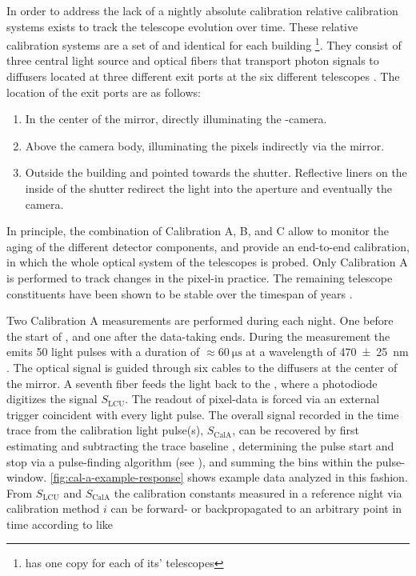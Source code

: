 In order to address the lack of a nightly absolute calibration relative 
calibration systems exists to track the telescope evolution over time. These 
relative calibration systems are a set of \LCUs and identical for each building
\footnote{\HEAT has one copy for each of its' telescopes}.
They consist of three central \LED light source and optical fibers that 
transport photon signals to diffusers located at three different exit ports at 
the six different telescopes \cite{robertsCalibrationPierreAuger2003}. The 
location of the exit ports are as follows:

\begin{enumerate}[label=(\Alph*)]
	\item In the center of the mirror, directly illuminating the 
	\FD-camera.
	\item Above the camera body, illuminating the pixels indirectly via the
	mirror.
	\item Outside the \FD building and pointed towards the shutter.
	Reflective liners on the inside of the shutter redirect the light into 
	the aperture and eventually the camera.
\end{enumerate}

In principle, the combination of Calibration A, B, and C allow to monitor the 
aging of the different detector components, and provide an end-to-end 
calibration, in which the whole optical system of the telescopes is probed. 
Only Calibration A is performed to track changes in the pixel-\PMTs in 
practice. The  remaining telescope constituents have been shown to be stable 
over the timespan of years \cite{brackAugerFluorescenceDetector2013, 
dorofeevFDAbsoluteCalibration2013}.

Two Calibration A measurements are performed during each night. One before the 
start of \DAQ, and one after the data-taking ends. During the measurement the 
\LED emits 50 light pulses with a duration of $\approx\SI{60}{\micro\second}$ 
at a wavelength of \SI{470\pm25}{\nano\meter} 
\cite{menshikovLEDCalibrationUnit}. The optical signal is guided through six 
cables to the diffusers at the center of the mirror. A seventh fiber feeds the 
light back to the \LCU, where a photodiode digitizes the signal 
$S_\mathrm{LCU}$. The readout of pixel-data is forced via an external trigger 
coincident with every light pulse. The overall signal recorded in the \FD time 
trace from the calibration light pulse(s), $S_\mathrm{CalA}$, can be recovered 
by first estimating and subtracting the trace baseline 
\cite{schaferReconstructionBaselineUndershoot2022}, determining the pulse start
and stop via a pulse-finding algorithm (see ), and 
summing the \ADC bins within the pulse-window. 
\cref{fig:cal-a-example-response} shows example data analyzed in this fashion. 
From $S_\mathrm{LCU}$ and $S_\mathrm{CalA}$ the calibration constants measured 
in a reference night via calibration method $i$ can be forward- or 
backpropagated to an arbitrary point in time according to 
\cite{salinaNewCalibrationTask2014, salinaAnalisiDatiXY2025} like

